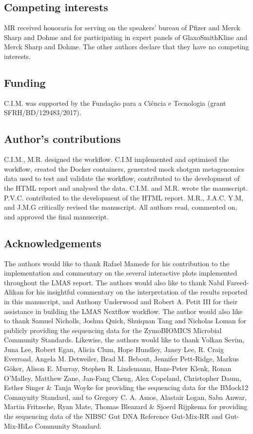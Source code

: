 \subsection{Competing interests}

MR received honoraria for serving on the speakers' bureau of Pﬁzer and Merck Sharp and Dohme and for participating in expert panels of GlaxoSmithKline and Merck Sharp and Dohme. The other authors declare that they have no competing interests.  

\subsection{Funding}

C.I.M. was supported by the Fundação para a Ciência e Tecnologia (grant SFRH/BD/129483/2017).

\subsection{Author’s contributions}

C.I.M., M.R. designed the workflow. C.I.M implemented and optimised the workflow, created the Docker containers, generated mock shotgun metagenomics data used to test and validate the workflow, contributed to the development of the HTML report and analysed the data. C.I.M. and M.R. wrote the manuscript. P.V.C. contributed to the development of the HTML report. M.R., J.A.C. Y.M, and J.M.G critically revised the manuscript.  All authors read, commented on, and approved the final manuscript. 

\subsection{Acknowledgements}

The authors would like to thank Rafael Mamede for his contribution to the implementation and commentary on the several interactive plots implemented throughout the LMAS report. The authors would also like to thank Nabil Fareed-Alikan for his insightful commentary on the interpretation of the results reported in this manuscript, and Anthony Underwood and Robert A. Petit III for their assistance in building the LMAS Nextflow workflow. The author would also like to thank Samuel Nicholls, Joshua Quick, Shuiquan Tang and Nicholas Loman for publicly providing the sequencing data for the ZymoBIOMICS Microbial Community Standards. Likewise, the authors would like to thank Volkan Sevim, Juna Lee, Robert Egan, Alicia Clum, Hope Hundley, Janey Lee, R. Craig Everroad, Angela M. Detweiler, Brad M. Bebout, Jennifer Pett-Ridge, Markus Göker, Alison E. Murray, Stephen R. Lindemann, Hans-Peter Klenk, Ronan O’Malley, Matthew Zane, Jan-Fang Cheng, Alex Copeland, Christopher Daum, Esther Singer & Tanja Woyke for providing the sequencing data for the BMock12 Commynity Standard, and to Gregory C. A. Amos, Alastair Logan, Saba Anwar, Martin Fritzsche, Ryan Mate, Thomas Bleazard & Sjoerd Rijpkema for providing the sequencing data of the NIBSC Gut DNA Reference Gut-Mix-RR and Gut-Mix-HiLo Community Standard.

